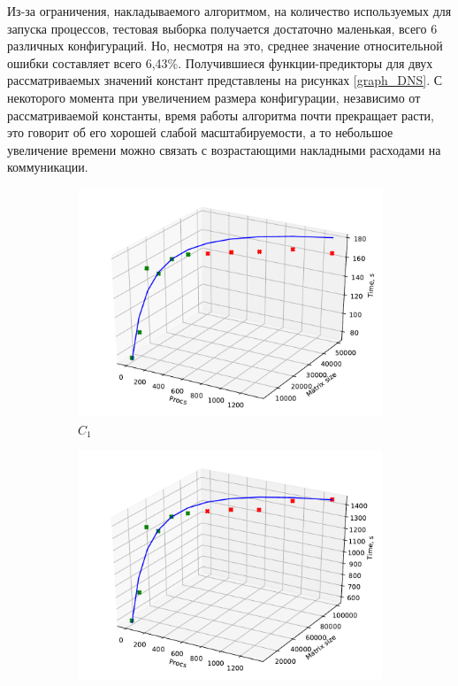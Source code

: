			Из-за ограничения, накладываемого алгоритмом, на количество используемых для запуска процессов, тестовая выборка получается достаточно маленькая, всего 6 различных конфигураций. Но, несмотря на это, среднее значение относительной ошибки составляет всего 6,43\%. Получившиеся функции-предикторы для двух рассматриваемых значений констант представлены на рисунках \eqref{graph_DNS}. С некоторого момента при увеличением размера конфигурации, независимо от рассматриваемой константы, время работы алгоритма почти прекращает расти, это говорит об его хорошей слабой масштабируемости, а то небольшое увеличение времени можно связать с возрастающими накладными расходами на коммуникации.

			\begin{figure}
			\centering
			\begin{subfigure}{.5\textwidth}
				\centering
				\includegraphics[width=\linewidth]{./images/graph_C_1_DNS}
				\caption{\(C_1\)}
				\label{graph_C_1_DNS}
			\end{subfigure}
			\begin{subfigure}{.5\textwidth}
				\centering
				\includegraphics[width=\linewidth]{./images/graph_C_2_DNS}

\end{subfigure}
\end{figure}

